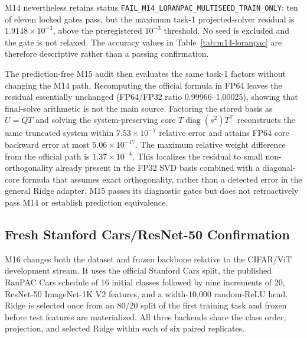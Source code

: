 \documentclass[runningheads]{llncs}
\begin{document}
M14 nevertheless retains status
\texttt{FAIL\_M14\_LORANPAC\_MULTISEED\_TRAIN\_ONLY}: ten of eleven locked
gates pass, but the maximum task-1 projected-solver residual is
$1.9148\times10^{-3}$, above the preregistered $10^{-3}$ threshold. No seed is
excluded and the gate is not relaxed. The accuracy values in
Table~\ref{tab:m14-loranpac} are therefore descriptive rather than a passing
confirmation.

The prediction-free M15 audit then evaluates the same task-1 factors without
changing the M14 path. Recomputing the official formula in FP64 leaves the
residual essentially unchanged (FP64/FP32 ratio 0.99966--1.00025), showing
that final-solve arithmetic is not the main source. Factoring the stored basis
as $U=QT$ and solving the system-preserving core
$T\operatorname{diag}(s^2)T^\top$ reconstructs the same truncated system
within $7.53\times10^{-7}$ relative error and attains FP64 core backward error
at most $5.06\times10^{-17}$. The maximum relative weight difference from the
official path is $1.37\times10^{-4}$. This localizes the residual to small
non-orthogonality already present in the FP32 SVD basis combined with a
diagonal-core formula that assumes exact orthogonality, rather than a detected
error in the general Ridge adapter. M15 passes its diagnostic gates but does
not retroactively pass M14 or establish prediction equivalence.

\subsection{Fresh Stanford Cars/ResNet-50 Confirmation}

M16 changes both the dataset and frozen backbone relative to the CIFAR/ViT
development stream. It uses the official Stanford Cars split, the published
RanPAC Cars schedule of 16 initial classes followed by nine increments of 20,
ResNet-50 ImageNet-1K V2 features, and a width-10,000 random-ReLU head. Ridge is
selected once from an 80/20 split of the first training task and frozen before
test features are materialized. All three backends share the class order,
projection, and selected Ridge within each of six paired replicates.

\begin{table}
\caption{Locked Stanford Cars confirmation on a controlled RanPAC Phase-2
head. Values are mean $\pm$ sample standard deviation over six paired
replicates. Differences are compressed backend minus Exact.}
\label{tab:m16-cars}
\centering
\small
{}
\end{table}
\end{document}
